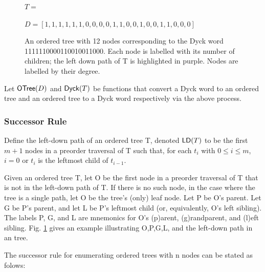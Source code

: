 \begin{figure}
$T=$


$D=[1, 1, 1, 1, 1, 1, 0, 0, 0, 0, 1, 1, 0, 0, 1, 0, 0, 1, 1, 0, 0, 0]$
\caption{An ordered tree with 12 nodes corresponding to the Dyck word 1111110000110010011000.  Each node is labelled with its number of children; the left down path of T is highlighted in purple. Nodes are labelled by their degree.}
\label{exampleotree}
\end{figure}

Let $\mathsf{OTree}{(D)}$ and $\mathsf{Dyck}{(T)}$ be functions that convert a Dyck word to an ordered tree and an ordered tree to a Dyck word respectively via the above process. 


\subsubsection{Successor Rule}

Define the left-down path of an ordered tree T, denoted $\mathsf{LD}{(T)}$ to be the first $m+1$ nodes in a preorder traversal of T such that, for each $t_i$ with $0 \le i \le m$, $i=0$ or $t_i$ is the leftmost child of $t_{i-1}$.

Given an ordered tree T, let O be the first node in a preorder traversal of T that is not in the left-down path of T. If there is no such node, in the case where the tree is a single path, let O be the tree's (only) leaf node.  Let P be O's parent.  Let G be P's parent, and let L be P's leftmost child (or, equivalently, O's left sibling).  The labels P, G, and L are mnemonics for O's (p)arent, (g)randparent, and (l)eft sibling. 
 Fig. \ref{exampleotree} gives an example illustrating O,P,G,L, and the left-down path in an tree.


The successor rule for enumerating ordered trees with n nodes can be stated as folows:

